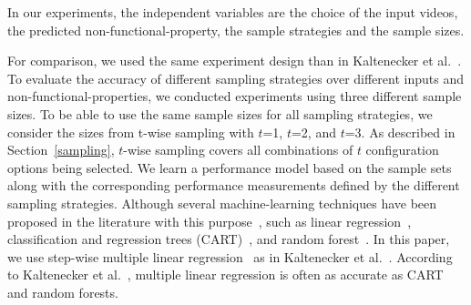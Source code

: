 


In our experiments, the independent variables are the choice of the input videos, the predicted non-functional-property, the sample strategies and the sample sizes.

For comparison, we used the same experiment design than in Kaltenecker et al.~\cite{kaltenecker2019}.
To evaluate the accuracy of different sampling strategies over different inputs and non-functional-properties, we conducted experiments using three different sample sizes. %
To be able to use the same sample sizes for all sampling strategies, we consider the sizes from t-wise sampling with $t$=1, $t$=2, and $t$=3.
As described in Section~\ref{sampling}, $t$-wise sampling covers all combinations of $t$ configuration options being selected.
We learn a performance model based on the sample sets along with the corresponding performance measurements defined by the different sampling strategies.
Although several machine-learning techniques have been proposed in the literature with this purpose~\cite{julianasurvey}, such as linear regression~\cite{jamshidi2017b,kolesnikov2018,weckesser2018,kolesnikov2017,kaltenecker2019,jamshidi2019,siegmund2008,siegmund2015FSE,murwantara2014,samreen2016, chen2005, lillacka2013}, classification and regression trees (CART)~\cite{guo2017,jamshidi2017b,murwantara2014,nair2017,nair2018a,sarkar2015,temple2016,temple2017a,valov2015,valov2017,westermann2012,acher2018,nair2018c,yilmaz2006,krismayer2017,porter2007,zheng2007, zhang2016, song2013}, and random forest~\cite{valov2015, amand2019, queiroz2016, bao2018, thornton2013}.
In this paper, we use step-wise multiple linear regression~\cite{siegmund2015FSE} as in Kaltenecker et al.~\cite{kaltenecker2019}. According to Kaltenecker et al.~\cite{kaltenecker2019}, multiple linear regression is often as accurate as CART and random forests.

